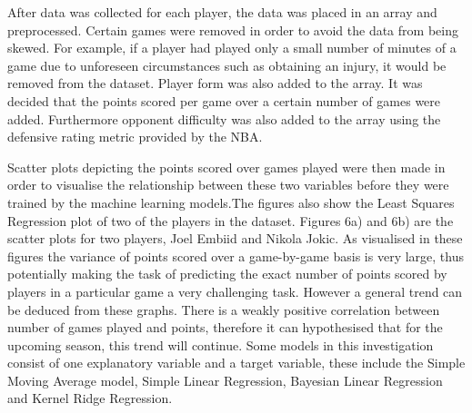\documentclass[a4paper,11pt,twoside]{article}
\begin{document}
After data was collected for each player, the data was placed in an array and preprocessed. Certain games were removed in order to avoid the data from being skewed. For example, if a player had played only a small number of minutes of a game due to unforeseen circumstances such as obtaining an injury, it would be removed from the dataset. Player form was also added to the array. It was decided that the points scored per game over a certain number of games were added. Furthermore opponent difficulty was also added to the array using the defensive rating metric provided by the NBA.

Scatter plots depicting the points scored over games played were then made in order to visualise the relationship between these two variables before they were trained by the machine learning models.The figures also show the Least Squares Regression plot of two of the players in the dataset. Figures 6a) and 6b) are the scatter plots for two players, Joel Embiid and Nikola Jokic. As visualised in these figures the variance of points scored over a game-by-game basis is very large, thus potentially making the task of predicting the exact number of points scored by players in a particular game a very challenging task. However a general trend can be deduced from these graphs. There is a weakly positive correlation between number of games played and points, therefore it can hypothesised that for the upcoming season, this trend will continue. Some models in this investigation consist of one explanatory variable and a target variable, these include the Simple Moving Average model, Simple Linear Regression, Bayesian Linear Regression and Kernel Ridge Regression.
\end{document}
